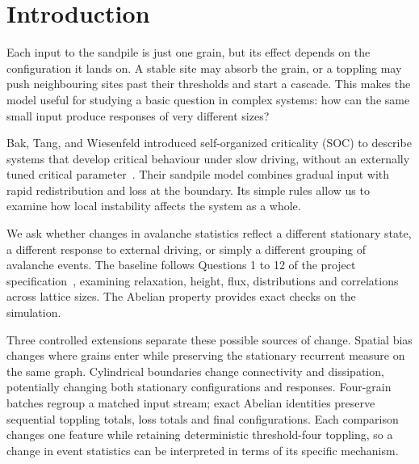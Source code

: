 \chapter{Introduction}\label{sec:intro}
Each input to the sandpile is just one grain, but its effect depends on the configuration it lands on. A stable site may absorb the grain, or a toppling may push neighbouring sites past their thresholds and start a cascade. This makes the model useful for studying a basic question in complex systems: how can the same small input produce responses of very different sizes?

Bak, Tang, and Wiesenfeld introduced self-organized criticality (SOC) to describe systems that develop critical behaviour under slow driving, without an externally tuned critical parameter~\cite{bak1987,bak1988}. Their sandpile model combines gradual input with rapid redistribution and loss at the boundary. Its simple rules allow us to examine how local instability affects the system as a whole.

We ask whether changes in avalanche statistics reflect a different stationary state, a different response to external driving, or simply a different grouping of avalanche events. The baseline follows Questions 1 to 12 of the project specification~\cite{handout}, examining relaxation, height, flux, distributions and correlations across lattice sizes. The Abelian property provides exact checks on the simulation.

Three controlled extensions separate these possible sources of change. Spatial bias changes where grains enter while preserving the stationary recurrent measure on the same graph. Cylindrical boundaries change connectivity and dissipation, potentially changing both stationary configurations and responses. Four-grain batches regroup a matched input stream; exact Abelian identities preserve sequential toppling totals, loss totals and final configurations. Each comparison changes one feature while retaining deterministic threshold-four toppling, so a change in event statistics can be interpreted in terms of its specific mechanism.
